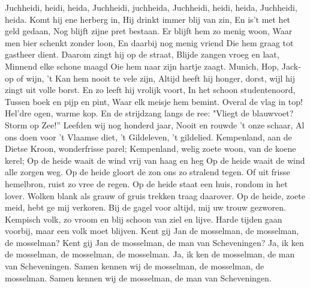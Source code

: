 \documentclass{article}
\begin{document}
\begin{songs}{}
\endverse
\beginchorus
Juchheidi, heidi, heida,
Juchheidi, juchheida,
Juchheidi, heidi, heida,
Juchheidi, heida.
\endchorus
\beginverse
Komt hij ene herberg in,
Hij drinkt immer blij van zin,
En is't met het geld gedaan,
Nog blijft zijne pret bestaan.
\endverse
\beginverse
Er blijft hem zo menig woon,
Waar men bier schenkt zonder loon,
En daarbij nog menig vriend
Die hem graag tot gastheer dient.
\endverse
\beginverse
Daarom zingt hij op de straat,
Blijde zangen vroeg en laat,
Minnend elke schone maagd
Oie hem naar zijn hartje zaagt.
\endverse
\beginverse
Munich, Hop, Jack-op of wijn,
't Kan hem nooit te vele zijn,
Altijd heeft hij honger, dorst,
wijl hij zingt uit volle borst.
\endverse
\beginverse
En zo leeft hij vrolijk voort,
In het schoon studentenoord,
Tussen boek en pijp en pint,
Waar elk meisje hem bemint.
\endverse
\beginverse
Overal de vlag in top!
Hel'dre ogen, warme kop.
En de strijdzang langs de ree:
"Vliegt de blauwvoet? Storm op Zee!”
\endverse
\beginverse
Leefden wij nog honderd jaar,
Nooit en rouwde 't onze schaar,
Al ons doen voor 't Vlaamse diet,
't Gildeleven, 't gildelied.
\endverse
\endsong
{}
\beginverse
Kempenland, aan de Dietse Kroon,
wonderfrisse parel;
Kempenland, welig zoete woon,
van de koene kerel;
\endverse
\beginchorus
Op de heide waait de wind
vrij van haag en heg
Op de heide waait de wind
alle zorgen weg.
\endchorus
\beginverse
Op de heide gloort de zon
ons zo stralend tegen.
Of uit frisse hemelbron,
ruist zo vree de regen.
\endverse
\beginverse
Op de heide staat een huis,
rondom in het lover.
Wolken blank als grauw of gruis
trekken traag daarover.
\endverse
\beginverse
Op de heide, zoete meid,
hebt ge mij verkoren.
Bij de gagel voor altijd,
mij uw trouw gezworen.
\endverse
\beginverse
Kempisch volk, zo vroom en blij
schoon van ziel en lijve.
Harde tijden gaan voorbij,
maar een volk moet blijven.
\endverse
\endsong
{}
\beginverse
Kent gij Jan de mosselman, de mosselman, de mosselman?
Kent gij Jan de mosselman, de man van Scheveningen?
\endverse
\beginverse*
Ja, ik ken de mosselman, de mosselman, de mosselman.
Ja, ik ken de mosselman, de man van Scheveningen.
\endverse
\beginverse*
Samen kennen wij de mosselman, de mosselman, de mosselman.
Samen kennen wij de mosselman, de man van Scheveningen.
\endverse
\endsong



\end{songs}
\end{document}
